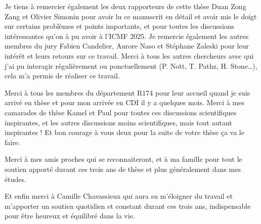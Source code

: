 Je tiens à remercier également les deux rapporteurs de cette thèse Duan Zong Zang et Olivier Simonin pour avoir lu ce manuscrit en détail et avoir mis le doigt sur certains problèmes et points importants, et pour toutes les discussions intéressantes qu'on à pu avoir à l'ICMF 2025. 
Je remercie également les autres membres du jury Fabien Candelier, Aurore Naso et Stéphane Zaleski pour leur intérêt et leurs retours sur ce travail. 
Merci à tous les autres chercheurs avec qui j'ai pu interagir régulièrement ou ponctuellement (P. Nott,  T. Pathz, H. Stone\ldots), cela m'a permis de réaliser ce travail. 


Merci à tous les membres du département R174 pour leur accueil quand je suis arrivé en thèse et pour mon arrivée en CDI il y a quelques mois. 
Merci à mes camarades de thèse Kamel et Paul pour toutes ces discussions scientifiques inspirantes, et les autres discussions moins scientifiques, mais tout autant inspirantes ! Et bon courage à vous deux pour la suite de  votre thèse ça va le faire. 

Merci à mes amis proches qui se reconnaiteront, et à ma famille pour tout le soutien apporté durant ces trois ans de thèse et plus généralement dans mes études. 

Et enfin merci à Camille Chavassieux qui aura su m'éloigner du travail et m'apporter un soutien quotidien et constant durant ces trois ans, indispensable pour être heureux et équilibré dans la vie.  

\newpage